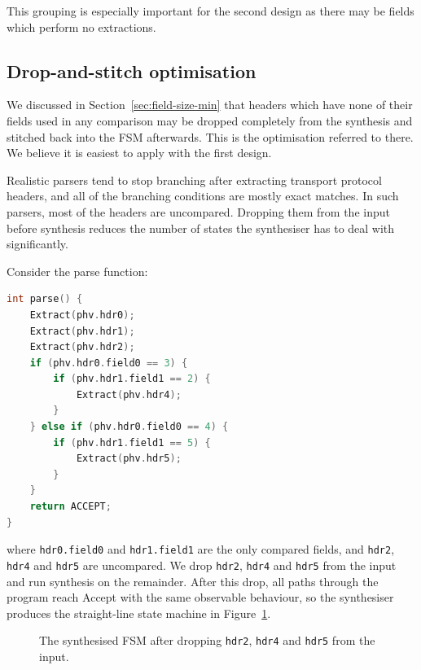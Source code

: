 This grouping is especially important for the second design as there may be fields which 
perform no extractions.

\subsection{Drop-and-stitch optimisation}
\label{sec:drop-and-stitch}

We discussed in Section~\ref{sec:field-size-min} that headers
which have none of their fields used in any comparison may be
dropped completely from the synthesis and stitched back into the
FSM afterwards. This is the optimisation referred to
there. We believe it is easiest to apply with the first design.

Realistic parsers tend to stop branching after extracting transport
protocol headers, and all of the branching conditions are mostly exact matches.
In such parsers, most of the headers are uncompared. Dropping them
from the input before synthesis reduces the number of states the
synthesiser has to deal with significantly.

Consider the parse function:

\begin{lstlisting}[style=codeside, language=C]
int parse() {
    Extract(phv.hdr0);
    Extract(phv.hdr1);
    Extract(phv.hdr2);
    if (phv.hdr0.field0 == 3) {
        if (phv.hdr1.field1 == 2) {
            Extract(phv.hdr4);
        }
    } else if (phv.hdr0.field0 == 4) {
        if (phv.hdr1.field1 == 5) {
            Extract(phv.hdr5);
        }
    }
    return ACCEPT;
}
\end{lstlisting}

where \texttt{hdr0.field0} and \texttt{hdr1.field1} are the only
compared fields, and \texttt{hdr2}, \texttt{hdr4} and \texttt{hdr5}
are uncompared. We
drop \texttt{hdr2}, \texttt{hdr4} and \texttt{hdr5} from the input
and run synthesis on the remainder. After this drop, all paths
through the program reach Accept with the same observable
behaviour, so the synthesiser produces the straight-line state
machine in Figure~\ref{fig:dropped-stm}.

\begin{figure}[H]
\centering
{}
\caption{The synthesised FSM after dropping
\texttt{hdr2}, \texttt{hdr4} and \texttt{hdr5} from the input.}
\label{fig:dropped-stm}
\end{figure}

